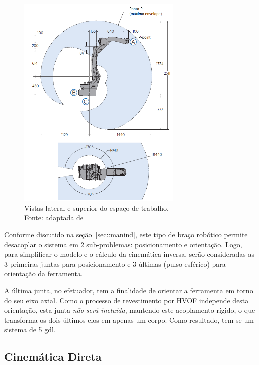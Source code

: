 \begin{figure}[h]
	\centering 
 	\includegraphics[width=0.7\textwidth]{figs/workspace}
 	\caption[Vistas lateral e superior do espaço de trabalho]{Vistas lateral e
 	superior do espaço de trabalho. \\Fonte: adaptada de}
 	\label{fig::workspace}
\end{figure}

Conforme discutido na seção~\ref{sec::manind}, este tipo de braço robótico
permite desacoplar o sistema em 2 sub-problemas: posicionamento e orientação.
Logo, para simplificar o modelo e o cálculo da cinemática inversa, serão consideradas
as 3 primeiras juntas para posicionamento e 3 últimas (pulso esférico) para
orientação da ferramenta.

A última junta, no efetuador, tem a finalidade de orientar a ferramenta em torno
do seu eixo axial. Como o processo de revestimento por HVOF independe desta
orientação, esta junta \emph{não será incluída}, mantendo este acoplamento
rígido, o que transforma os dois últimos elos em apenas um corpo.
Como resultado, tem-se um sistema de 5 gdl.


\subsection{Cinemática Direta}\label{sec::dkin}

